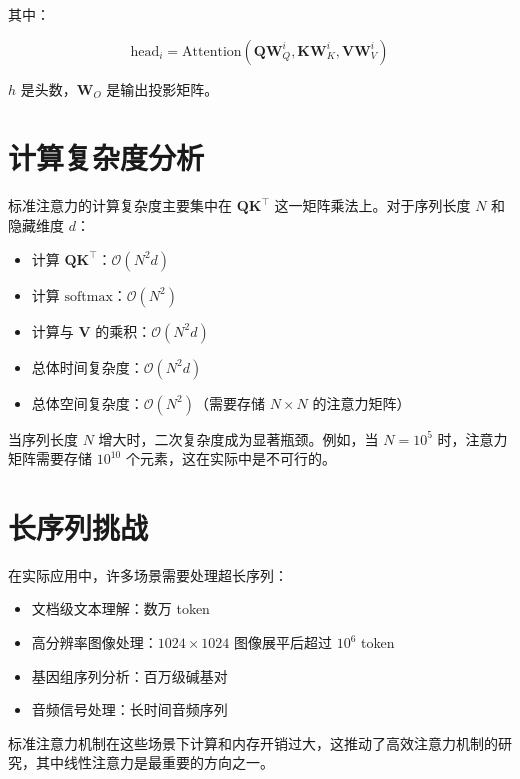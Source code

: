 其中：

\begin{equation}
    \text{head}_i = \text{Attention}(\mathbf{Q}\mathbf{W}_Q^i, \mathbf{K}\mathbf{W}_K^i, \mathbf{V}\mathbf{W}_V^i)
\end{equation}

$h$ 是头数，$\mathbf{W}_O$ 是输出投影矩阵。

\section{计算复杂度分析}

标准注意力的计算复杂度主要集中在 $\mathbf{Q}\mathbf{K}^\top$ 这一矩阵乘法上。对于序列长度 $N$ 和隐藏维度 $d$：

\begin{itemize}
    \item 计算 $\mathbf{Q}\mathbf{K}^\top$：$\mathcal{O}(N^2 d)$
    \item 计算 $\text{softmax}$：$\mathcal{O}(N^2)$
    \item 计算与 $\mathbf{V}$ 的乘积：$\mathcal{O}(N^2 d)$
    \item 总体时间复杂度：$\mathcal{O}(N^2 d)$
    \item 总体空间复杂度：$\mathcal{O}(N^2)$（需要存储 $N \times N$ 的注意力矩阵）
\end{itemize}

当序列长度 $N$ 增大时，二次复杂度成为显著瓶颈。例如，当 $N = 10^5$ 时，注意力矩阵需要存储 $10^{10}$ 个元素，这在实际中是不可行的。

\section{长序列挑战}

在实际应用中，许多场景需要处理超长序列：

\begin{itemize}
    \item 文档级文本理解：数万 token
    \item 高分辨率图像处理：$1024 \times 1024$ 图像展平后超过 $10^6$ token
    \item 基因组序列分析：百万级碱基对
    \item 音频信号处理：长时间音频序列
\end{itemize}

标准注意力机制在这些场景下计算和内存开销过大，这推动了高效注意力机制的研究，其中线性注意力是最重要的方向之一。
